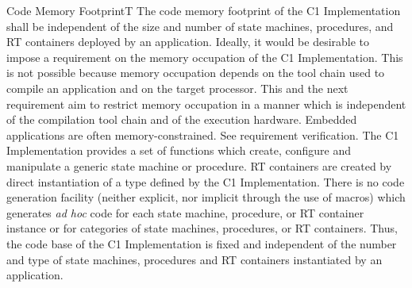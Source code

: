 \documentclass[a4paper,10pt]{article}
\newenvironment{fw_req_note}[7]
{\addtocounter{subsubsection}{1}
	\hspace{0.2cm}\textbf{FW-\arabic{section}.\arabic{subsection}.\arabic{subsubsection}/#2
	\hspace{0.8cm} #1}
	\vspace{-10pt}
\begin{longtable}{p{2.7cm}P{8.5cm}}
\hline
\textsc{Requirement} & #3 \\
\textsc{Note} & #4 \\
\textsc{Justification} & #5 \\
\textsc{Implementation} & #6  \\ 
\textsc{Verification} & #7  \\
\hline
}
{\end{longtable}}
\begin{document}
\begin{fw_req_note}{Code Memory Footprint}{T}
{The code memory footprint of the C1 Implementation shall be independent of 
the size and number of state machines, procedures, and RT containers deployed by an application.}
{Ideally, it would be desirable to impose a requirement on the memory occupation 
of the C1 Implementation. 
This is not possible because memory occupation depends on the tool chain used to compile an 
application and on the target processor. 
This and the next requirement aim to restrict memory occupation in a manner which is independent of the compilation tool chain and of the execution hardware.}
{Embedded applications are often memory-constrained.}
{See requirement verification.} 
{The C1 Implementation provides a set of functions which create, 
configure and manipulate a generic state machine or procedure. 
RT containers are created by direct instantiation of a type defined by the C1 Implementation. 
There is no code generation facility (neither explicit, nor implicit through the use of macros) which generates \emph{ad hoc} code for each state machine, procedure, or RT container instance or for categories of state machines, procedures, or RT containers. 
Thus, the code base of the C1 Implementation is fixed and independent of the number 
and type of state machines, procedures and RT containers instantiated by an application.}
\end{fw_req_note}
\end{document}
